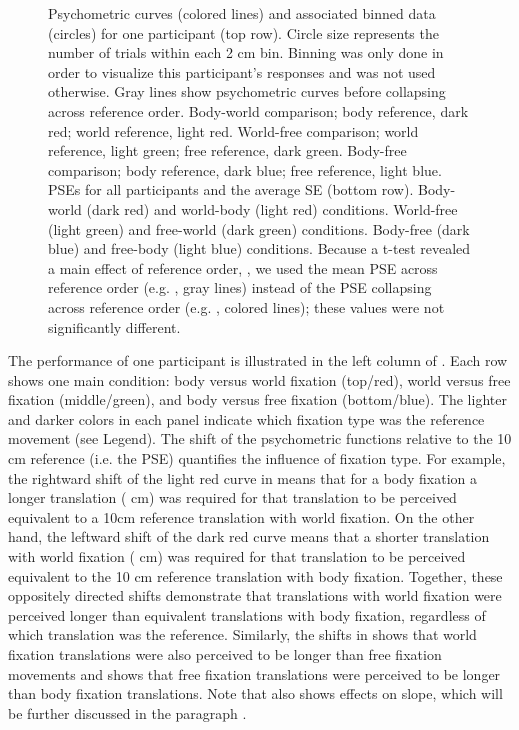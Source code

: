 \begin{figure}
    \caption{Psychometric curves (colored lines) and associated binned data (circles) for one participant (top row). Circle size represents the number of trials within each 2 \si{\centi\metre} bin. Binning was only done in order to visualize this participant's responses and was not used otherwise. Gray lines show psychometric curves before collapsing across reference order.  Body-world comparison; body reference, dark red; world reference, light red.  World-free comparison; world reference, light green; free reference, dark green.   Body-free comparison; body reference, dark blue; free reference, light blue. \newline
PSEs for all participants and the average {\textpm}SE (bottom row).  Body-world (dark red) and world-body (light red) conditions.  World-free (light green) and free-world (dark green) conditions.  Body-free (dark blue) and free-body (light blue) conditions. Because a t-test revealed a main effect of reference order, , we used the mean PSE across reference order (e.g. , gray lines) instead of the PSE collapsing across reference order (e.g. , colored lines); these values were not significantly different.}
    \label{p3:fig2}
\end{figure}

The performance of one participant is illustrated in the left column of . Each row shows one main condition: body versus world fixation (top/red), world versus free fixation (middle/green), and body versus free fixation (bottom/blue). The lighter and darker colors in each panel indicate which fixation type was the reference movement (see Legend). The shift of the psychometric functions relative to the 10 \si{\centi\metre} reference (i.e. the PSE) quantifies the influence of fixation type. For example, the rightward shift of the light red curve in  means that for a body fixation a longer translation ( \si{\centi\metre}) was required for that translation to be perceived equivalent to a 10\si{\centi\metre} reference translation with world fixation. On the other hand, the leftward shift of the dark red curve means that a shorter translation with world fixation ( \si{\centi\metre}) was required for that translation to be perceived equivalent to the 10 \si{\centi\metre} reference translation with body fixation. Together, these oppositely directed shifts demonstrate that translations with world fixation were perceived longer than equivalent translations with body fixation, regardless of which translation was the reference.  Similarly, the shifts in  shows that world fixation translations were also perceived to be longer than free fixation movements and  shows that free fixation translations were perceived to be longer than body fixation translations. Note that  also shows effects on slope, which will be further discussed in the paragraph .

